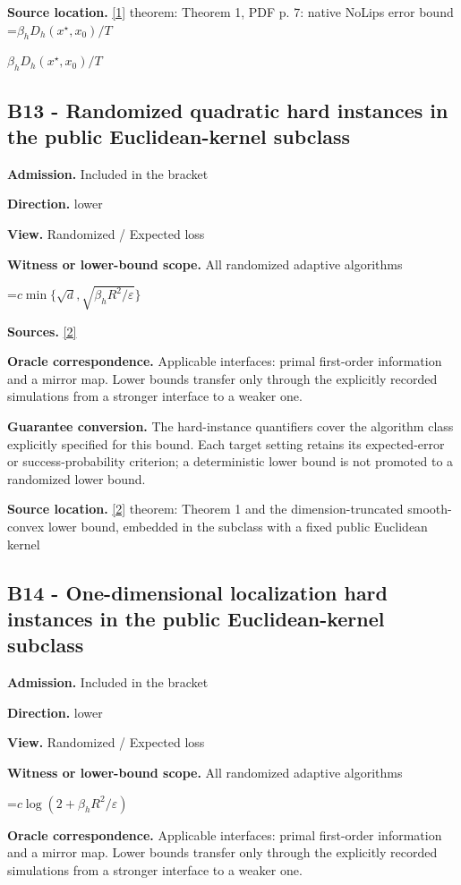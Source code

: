 \documentclass[10pt,a4paper]{article}
\newcommand{\AtlasMath}[1]{\par\begingroup\centering\setbox0=\hbox{$\displaystyle #1$}\ifdim\wd0>1.4\linewidth\typeout{ATLAS WIDE FORMULA: \the\wd0}\fi\ifdim\wd0>\linewidth\resizebox{\linewidth}{!}{\box0}\else\box0\fi\par\endgroup}
\newcommand{\AtlasInlineMath}[1]{\begingroup\setbox0=\hbox{$#1$}\ifdim\wd0>.4\linewidth\endgroup\AtlasMath{#1}\else\endgroup$#1$\fi}
\begin{document}
\textbf{Source location.} \href{https://arxiv.org/pdf/1911.08510v3}{[1]} theorem: Theorem 1, PDF p. 7: native NoLips error bound \AtlasInlineMath{\beta_hD_h(x^\star,x_0)/T}

\subsection{B13 - Randomized quadratic hard instances in the public Euclidean-kernel subclass}
\textbf{Admission.} Included in the bracket

\textbf{Direction.} lower

\textbf{View.} Randomized / Expected loss

\textbf{Witness or lower-bound scope.} All randomized adaptive algorithms

\AtlasMath{c\min\{\sqrt d,\sqrt{\beta_hR^2/\varepsilon}\}}
\textbf{Sources.} \href{https://arxiv.org/pdf/2609.10874}{[2]}

\textbf{Oracle correspondence.} Applicable interfaces: primal first-order information and a mirror map. Lower bounds transfer only through the explicitly recorded simulations from a stronger interface to a weaker one.

\textbf{Guarantee conversion.} The hard-instance quantifiers cover the algorithm class explicitly specified for this bound. Each target setting retains its expected-error or success-probability criterion; a deterministic lower bound is not promoted to a randomized lower bound.

\textbf{Source location.} \href{https://arxiv.org/pdf/2609.10874}{[2]} theorem: Theorem 1 and the dimension-truncated smooth-convex lower bound, embedded in the subclass with a fixed public Euclidean kernel

\subsection{B14 - One-dimensional localization hard instances in the public Euclidean-kernel subclass}
\textbf{Admission.} Included in the bracket

\textbf{Direction.} lower

\textbf{View.} Randomized / Expected loss

\textbf{Witness or lower-bound scope.} All randomized adaptive algorithms

\AtlasMath{c\log(2+\beta_hR^2/\varepsilon)}
\textbf{Oracle correspondence.} Applicable interfaces: primal first-order information and a mirror map. Lower bounds transfer only through the explicitly recorded simulations from a stronger interface to a weaker one.
\end{document}
